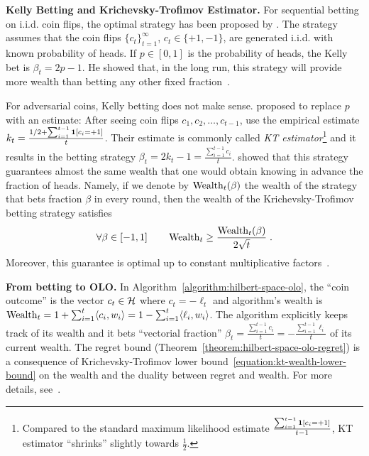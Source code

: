 \textbf{Kelly Betting and Krichevsky-Trofimov Estimator.}
For sequential betting on i.i.d. coin flips, the optimal strategy has been
proposed by \citet{Kelly-1956}.  The strategy assumes that the coin flips
$\{c_t\}_{t=1}^\infty$, $c_t \in \{+1,-1\}$, are generated i.i.d. with known
probability of heads. If $p \in [0,1]$ is the probability of heads, the Kelly
bet is $\beta_t = 2p - 1$. He showed that, in the long run, this strategy will
provide more wealth than betting any other fixed fraction~\citep{Kelly-1956}.

For adversarial coins, Kelly betting does not make sense.
\citet{Krichevsky-Trofimov-1981} proposed to replace $p$ with an estimate:
After seeing coin flips $c_1, c_2, \dots, c_{t-1}$, use the empirical
estimate $k_t = \frac{1/2 + \sum_{i=1}^{t-1} \mathbf{1}[c_i = +1]}{t}$. Their
estimate is commonly called \emph{KT estimator}\footnote{Compared to the
standard maximum likelihood estimate $\frac{\sum_{i=1}^{t-1} \mathbf{1}[c_i =
+1]}{t-1}$, KT estimator ``shrinks'' slightly towards $\frac{1}{2}$.} and it
results in the betting strategy $\beta_t = 2k_t - 1 = \tfrac{\sum_{i=1}^{t-1}
c_i}{t}$.  \citeauthor{Krichevsky-Trofimov-1981} showed that this strategy
guarantees almost the same wealth that one would obtain knowing in advance the
fraction of heads. Namely, 
if we denote by $\operatorname{Wealth}_t(\beta)$ the wealth of the strategy that bets fraction
$\beta$ in every round, then the wealth of the Krichevsky-Trofimov betting strategy
satisfies
\begin{equation}
\label{equation:kt-wealth-lower-bound}
\forall \beta \in [-1,1] \qquad \operatorname{Wealth}_t \ge \frac{\operatorname{Wealth}_t(\beta)}{2\sqrt{t}} \; .
\end{equation}
Moreover, this guarantee is optimal up to constant multiplicative factors~\citep{Cesa-Bianchi-Lugosi-2006}.

\textbf{From betting to \ac{OLO}.}
In Algorithm~\ref{algorithm:hilbert-space-olo}, the ``coin outcome'' is the
vector $c_t \in \mathcal{H}$ where $c_t = -\ell_t$ and algorithm's wealth is $\operatorname{Wealth}_t
= 1 + \sum_{i=1}^t \langle c_i, w_i \rangle = 1 - \sum_{i=1}^t \langle \ell_i,
w_i \rangle$.  The algorithm explicitly keeps track of its wealth and it bets
``vectorial fraction'' $\beta_t = \tfrac{\sum_{i=1}^{t-1} c_i}{t} = -
\tfrac{\sum_{i=1}^{t-1}\ell_i}{t}$ of its current wealth. The regret bound
(Theorem~\ref{theorem:hilbert-space-olo-regret}) is a consequence of
Krichevsky-Trofimov lower bound~\eqref{equation:kt-wealth-lower-bound} on the
wealth and the duality between regret and wealth.  For more details,
see~\cite{Orabona-Pal-2016-parameter-free}.
